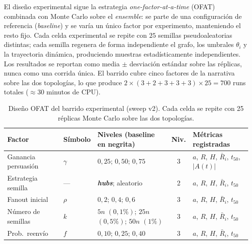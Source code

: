 \medskip

El diseño experimental sigue la estrategia \emph{one-factor-at-a-time} (OFAT) combinada con Monte Carlo sobre el \emph{ensemble}: se parte de una configuración de referencia (\emph{baseline}) y se varía un único factor por experimento, manteniendo el resto fijo. Cada celda experimental se repite con $25$ semillas pseudoaleatorias distintas; cada semilla regenera de forma independiente el grafo, los umbrales $\theta_i$ y la trayectoria dinámica, produciendo muestras estadísticamente independientes. Los resultados se reportan como media $\pm$ desviación estándar sobre las réplicas, nunca como una corrida única. El barrido cubre cinco factores de la narrativa sobre las dos topologías, lo que produce $2 \times (3+2+3+3+3) \times 25 = 700$ runs totales ($\approx 30$ minutos de CPU).

\begin{table}[ht]
  \centering
  \small
  \caption{Diseño OFAT del barrido experimental (sweep v2). Cada celda se repite con 25 réplicas Monte Carlo sobre las dos topologías.}
  \label{tab:experimentos}
  \begin{tabular}{@{}l p{2.6cm} p{4.5cm} c p{3.4cm}@{}}
    \toprule
    \textbf{Factor} & \textbf{Símbolo} & \textbf{Niveles (baseline en negrita)} & \textbf{Niv.} & \textbf{Métricas registradas} \\
    \midrule
    Ganancia persuasión & $\gamma$ & $0{,}25$; \textbf{$0{,}50$}; $0{,}75$ & 3 & $a$, $R$, $H$, $\bar{R}_i$, $t_{50}$, $|A(t)|$ \\
    \addlinespace
    Estrategia semilla & --- & \textbf{\emph{hubs}}; aleatorio & 2 & $a$, $R$, $H$, $\bar{R}_i$, $t_{50}$ \\
    \addlinespace
    Fanout inicial & $\rho$ & $0{,}2$; \textbf{$0{,}4$}; $0{,}6$ & 3 & $a$, $R$, $H$, $\bar{R}_i$, $t_{50}$ \\
    \addlinespace
    Número de semillas & $k$ & $5n$ $(0{,}1\%)$; \textbf{$25n$} $(0{,}5\%)$; $50n$ $(1\%)$ & 3 & $a$, $R$, $H$, $\bar{R}_i$, $t_{50}$ \\
    \addlinespace
    Prob.\ reenvío & $f$ & $0{,}10$; \textbf{$0{,}25$}; $0{,}40$ & 3 & $a$, $R$, $H$, $\bar{R}_i$, $t_{50}$ \\
    \bottomrule
  \end{tabular}
\end{table}
